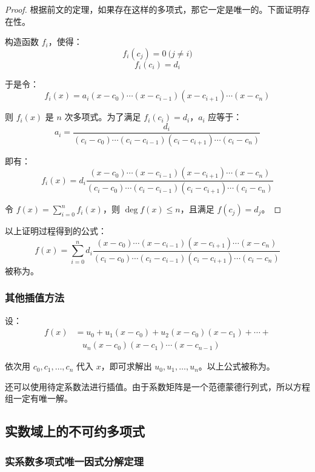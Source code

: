 \begin{proof}
	根据前文的定理，如果存在这样的多项式，那它一定是唯一的。下面证明存在性。

	构造函数 $f_i$，使得：
	$$
	f_i(c_j) = 0 \pod{j \ne i}
	$$$$
	f_i(c_i) = d_i
	$$

	于是令：
	$$
	f_i(x) = a_i (x - c_0) \cdots (x - c_{i - 1}) (x - c_{i + 1}) \cdots (x - c_n)
	$$

	则 $f_i(x)$ 是 $n$ 次多项式。为了满足 $f_i(c_i) = d_i$，$a_i$ 应等于：
	$$
	a_i = \dfrac{d_i}{(c_i - c_0) \cdots (c_i - c_{i - 1}) (c_i - c_{i + 1}) \cdots (c_i - c_n)}
	$$

	即有：
	$$
	f_i(x) = d_i \dfrac{(x - c_0) \cdots (x - c_{i - 1}) (x - c_{i + 1}) \cdots (x - c_n)}{(c_i - c_0) \cdots (c_i - c_{i - 1}) (c_i - c_{i + 1}) \cdots (c_i - c_n)}
	$$

	令 $f(x) = \sum\limits_{i = 0}^n f_i(x)$，则 $\deg f(x) \le n$，且满足 $f(c_j) = d_j$。
\end{proof}

以上证明过程得到的公式：
$$
f(x) = \sum\limits_{i = 0}^n d_i \dfrac{(x - c_0) \cdots (x - c_{i - 1}) (x - c_{i + 1}) \cdots (x - c_n)}{(c_i - c_0) \cdots (c_i - c_{i - 1}) (c_i - c_{i + 1}) \cdots (c_i - c_n)}
$$
被称为\emph{}。

\subsubsection{其他插值方法}

设：
$$
\begin{aligned}
	f(x) &= u_0 + u_1 (x - c_0) + u_2 (x - c_0) (x - c_1) + \cdots +
	\\&~~~~
	u_n (x - c_0) (x - c_1) \cdots (x - c_{n - 1})
\end{aligned}
$$

依次用 $c_0, c_1, \ldots, c_n$ 代入 $x$，即可求解出 $u_0, u_1, \ldots, u_n$。以上公式被称为\emph{}。

\bigskip

还可以使用待定系数法进行插值。由于系数矩阵是一个范德蒙德行列式，所以方程组一定有唯一解。

\subsection{实数域上的不可约多项式}

\subsubsection{实系数多项式唯一因式分解定理}

